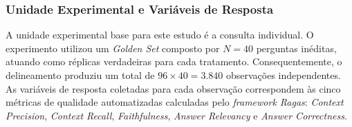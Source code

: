 \subsubsection{Unidade Experimental e Variáveis de Resposta}

A unidade experimental base para este estudo é a consulta individual. O experimento utilizou um \textit{Golden Set} composto por $N=40$ perguntas inéditas, atuando como réplicas verdadeiras para cada tratamento. Consequentemente, o delineamento produziu um total de $96 \times 40 = 3.840$ observações independentes. As variáveis de resposta coletadas para cada observação correspondem às cinco métricas de qualidade automatizadas calculadas pelo \textit{framework Ragas}: \textit{Context Precision}, \textit{Context Recall}, \textit{Faithfulness}, \textit{Answer Relevancy} e \textit{Answer Correctness}.
